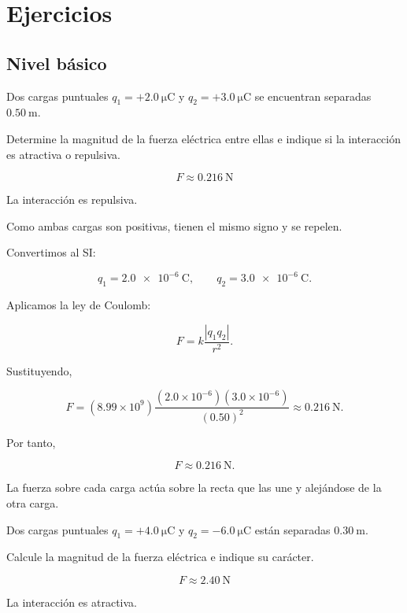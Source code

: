 \section{Ejercicios}

\subsection{Nivel básico}

\begin{ejercicio}
Dos cargas puntuales \(q_1=+\SI{2.0}{\micro\coulomb}\) y
\(q_2=+\SI{3.0}{\micro\coulomb}\) se encuentran separadas
\(\SI{0.50}{\metre}\).

Determine la magnitud de la fuerza eléctrica entre ellas e indique si la
interacción es atractiva o repulsiva.
\end{ejercicio}

\begin{respuesta}
\[
\boxed{F\approx\SI{0.216}{\newton}}
\]

La interacción es repulsiva.
\end{respuesta}

\begin{explicacion}
Como ambas cargas son positivas, tienen el mismo signo y se repelen.

Convertimos al SI:

\[
q_1=\SI{2.0e-6}{\coulomb}, \qquad q_2=\SI{3.0e-6}{\coulomb}.
\]

Aplicamos la ley de Coulomb:

\[
F=k\frac{|q_1q_2|}{r^2}.
\]

Sustituyendo,

\[
F=(8.99\times10^9)
\frac{(2.0\times10^{-6})(3.0\times10^{-6})}{(0.50)^2}
\approx\SI{0.216}{\newton}.
\]

Por tanto,

\[
\boxed{F\approx\SI{0.216}{\newton}}.
\]

La fuerza sobre cada carga actúa sobre la recta que las une y alejándose de
la otra carga.
\end{explicacion}


\begin{ejercicio}
Dos cargas puntuales \(q_1=+\SI{4.0}{\micro\coulomb}\) y
\(q_2=-\SI{6.0}{\micro\coulomb}\) están separadas
\(\SI{0.30}{\metre}\).

Calcule la magnitud de la fuerza eléctrica e indique su carácter.
\end{ejercicio}

\begin{respuesta}
\[
\boxed{F\approx\SI{2.40}{\newton}}
\]

La interacción es atractiva.
\end{respuesta}

